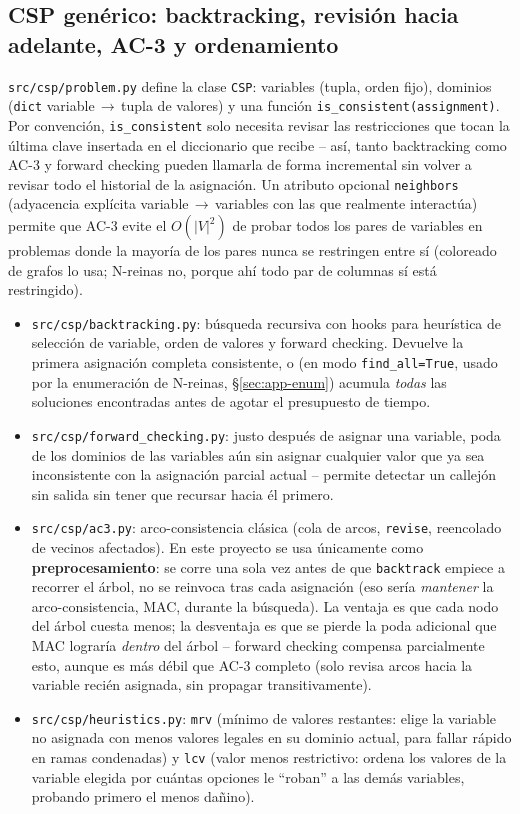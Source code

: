 \documentclass[11pt,onecolumn,letterpaper]{article}
\newcommand{\code}[1]{\texttt{#1}}
\begin{document}
\subsection{CSP gen\'erico: backtracking, revisi\'on hacia adelante, AC-3 y ordenamiento}
\label{sec:impl-csp}

\code{src/csp/problem.py} define la clase \code{CSP}: variables (tupla, orden fijo),
dominios (\code{dict} variable\,$\to$\,tupla de valores) y una funci\'on
\code{is\_consistent(assignment)}. Por convenci\'on, \code{is\_consistent} solo necesita
revisar las restricciones que tocan la \'ultima clave insertada en el diccionario que
recibe -- as\'i, tanto backtracking como AC-3 y forward checking pueden llamarla de forma
incremental sin volver a revisar todo el historial de la asignaci\'on. Un atributo
opcional \code{neighbors} (adyacencia expl\'icita variable\,$\to$\,variables con las que
realmente interact\'ua) permite que AC-3 evite el \code{$O(|V|^2)$} de probar todos los
pares de variables en problemas donde la mayor\'ia de los pares nunca se restringen entre
s\'i (coloreado de grafos lo usa; N-reinas no, porque ah\'i todo par de columnas s\'i est\'a
restringido).

\begin{itemize}[leftmargin=1.4em]
\item \code{src/csp/backtracking.py}: b\'usqueda recursiva con hooks para heur\'istica de
  selecci\'on de variable, orden de valores y forward checking. Devuelve la primera
  asignaci\'on completa consistente, o (en modo \code{find\_all=True}, usado por la
  enumeraci\'on de N-reinas, \S\ref{sec:app-enum}) acumula \emph{todas} las soluciones
  encontradas antes de agotar el presupuesto de tiempo.
\item \code{src/csp/forward\_checking.py}: justo despu\'es de asignar una variable, poda de
  los dominios de las variables a\'un sin asignar cualquier valor que ya sea inconsistente
  con la asignaci\'on parcial actual -- permite detectar un callej\'on sin salida sin tener
  que recursar hacia \'el primero.
\item \code{src/csp/ac3.py}: arco-consistencia cl\'asica (cola de arcos, \code{revise},
  reencolado de vecinos afectados). En este proyecto se usa \'unicamente como
  \textbf{preprocesamiento}: se corre una sola vez antes de que \code{backtrack} empiece a
  recorrer el \'arbol, no se reinvoca tras cada asignaci\'on (eso ser\'ia \emph{mantener} la
  arco-consistencia, MAC, durante la b\'usqueda). La ventaja es que cada nodo del \'arbol
  cuesta menos; la desventaja es que se pierde la poda adicional que MAC lograr\'ia
  \emph{dentro} del \'arbol -- forward checking compensa parcialmente esto, aunque es m\'as
  d\'ebil que AC-3 completo (solo revisa arcos hacia la variable reci\'en asignada, sin
  propagar transitivamente).
\item \code{src/csp/heuristics.py}: \code{mrv} (m\'inimo de valores restantes: elige la
  variable no asignada con menos valores legales en su dominio actual, para fallar r\'apido
  en ramas condenadas) y \code{lcv} (valor menos restrictivo: ordena los valores de la
  variable elegida por cu\'antas opciones le ``roban'' a las dem\'as variables, probando
  primero el menos da\~nino).
\end{itemize}
\end{document}
